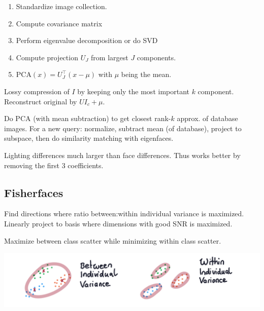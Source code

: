 \begin{definition}
  \begin{enumerate}
    \item Standardize image collection.
    \item Compute covariance matrix
    \item Perform eigenvalue decomposition or do SVD
    \item Compute projection \(U_J\) from largest \(J\) components.
    \item \(\text{PCA}(x) = U_J^\top(x - \mu)\) with \(\mu\) being the mean.
  \end{enumerate}
\end{definition}

\begin{definition}
  Lossy compression of \(I\) by keeping only the most important \(k\) component. Reconstruct original by \(UI_c + \mu\).
\end{definition}

\begin{algorithm}
  Do PCA (with mean subtraction) to get closest rank-\(k\) approx. of database images. For a new query: normalize, subtract mean (of database), project to subspace, then do similarity matching with eigenfaces.
\end{algorithm}

\begin{theorem}
  Lighting differences much larger than face differences. Thus works better by removing the first 3 coefficients.
\end{theorem}

\subsection{Fisherfaces}
Find directions where ratio between:within individual variance is maximized. Linearly project to basis where dimensions with good SNR is maximized.

\begin{algorithm}
  Maximize between class scatter while minimizing within class scatter.
\end{algorithm}

\includegraphics*[width=\linewidth]{assets/variances.png}
